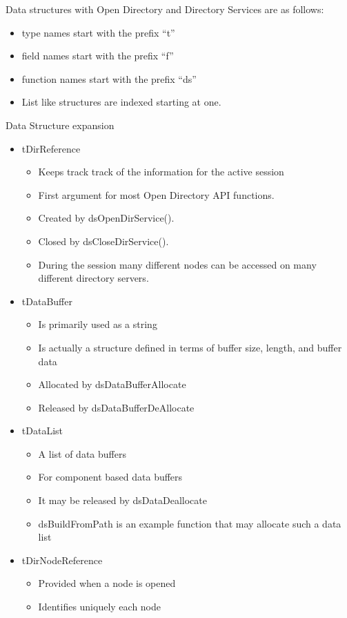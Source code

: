\documentclass[11pt]{article}
\begin{document}
Data structures with Open Directory and Directory Services are as follows:
\begin{itemize}
\item type names start with the prefix ``t''
\item field names start with the prefix ``f''
\item function names start with the prefix ``ds''
\item List like structures are indexed starting at one.
\end{itemize}

Data Structure expansion
\begin{itemize}
\item tDirReference 
\begin{itemize}
\item Keeps track track of the information for the active session
\item First argument for most Open Directory API functions.
\item Created by dsOpenDirService().
\item Closed by dsCloseDirService().
\item During the session many different nodes can be accessed on many different directory servers.  
\end{itemize}
\item tDataBuffer
\begin{itemize}
\item Is primarily used as a string
\item Is actually a structure defined in terms of buffer size, length, and buffer data
\item Allocated by dsDataBufferAllocate 
\item Released by dsDataBufferDeAllocate
\end{itemize}
\item tDataList 
\begin{itemize}
\item A list of data buffers
\item For component based data buffers
\item It may be released by dsDataDeallocate
\item dsBuildFromPath is an example function that may allocate such a data list
\end{itemize}
\item tDirNodeReference 
\begin{itemize}
\item Provided when a node is opened
\item Identifies uniquely each node

\end{itemize}
\end{itemize}
\end{document}
